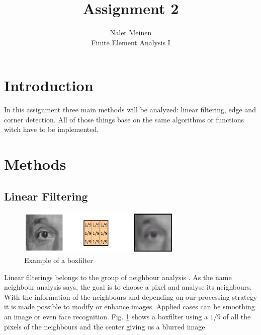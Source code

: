 \documentclass[12pt]{article}
\begin{document}


\title{Assignment 2}%
\author{Nalet Meinen\\ %
Finite Element Analysis I
}

\maketitle

\tableofcontents
\pagebreak
\section{Introduction}
In this assignment three main methods will be analyzed: linear filtering, edge and corner detection. All of those things
base on the same algorithms or functions witch have to be implemented.

\section{Methods}

\subsection{Linear Filtering}
\begin{figure}[!htb]
  \centering
  \includegraphics[width=0.7\textwidth]{pics/linear_filtering}
  \caption{Example of a boxfilter}
  \label{fig:linear_filtering}
\end{figure}

Linear filterings belongs to the group of neighbour analysis \cite{comp_intro}. As the 
name neighbour analysis says, the goal is to choose a pixel and analyse its neighbours.
With the information of the neighbours and depending on our processing strategy it is 
made possible to modify or enhance images. Applied cases can be smoothing an image or even
face recognition. Fig. \ref{fig:linear_filtering} shows a boxfilter using a $1/9$ of all
the pixels of the neighbours and the center giving us a blurred image.
\end{document}

